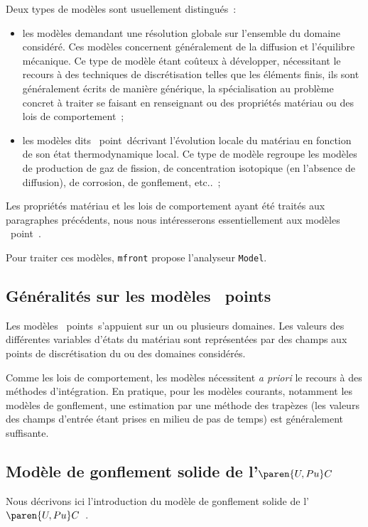 \documentclass[rectoverso,pleiades,pstricks,leqno,anti]{texmf/note_technique_2010}
\newcommand{\mfront}{\texttt{mfront}}
\newcommand{\upuc}{$\paren{U,Pu}C$}
\begin{document}
Deux types de modèles sont usuellement distingués~:
\begin{itemize}
\item les modèles demandant une résolution globale sur l'ensemble du
  domaine considéré. Ces modèles concernent généralement de la
  diffusion et l'équilibre mécanique. Ce type de modèle étant coûteux
  à développer, nécessitant le recours à des techniques de
  discrétisation telles que les éléments finis, ils sont généralement
  écrits de manière générique, la spécialisation au problème concret à
  traiter se faisant en renseignant ou des propriétés matériau ou des
  lois de comportement~;
\item les modèles dits \og~point~\fg décrivant l'évolution locale du
  matériau en fonction de son état thermodynamique local. Ce type de modèle
  regroupe les modèles de production de gaz de fission, de concentration
  isotopique (en l'absence de diffusion), de corrosion, de gonflement, etc..~;
\end{itemize}

Les propriétés matériau et les lois de comportement ayant été traités aux
paragraphes précédents, nous nous intéresserons essentiellement aux 
modèles \og~point~\fg.

Pour traiter ces modèles, \mfront{} propose l'analyseur \texttt{Model}.

\subsection{Généralités sur les modèles \og~points~\fg}

Les modèles \og~points~\fg s'appuient sur un ou plusieurs domaines.
Les valeurs des différentes variables d'états du matériau sont
représentées par des champs aux points de discrétisation du ou
des domaines considérés.

Comme les lois de comportement, les modèles nécessitent
\textit{a priori} le recours à des méthodes d'intégration.
En pratique, pour les modèles courants, notamment les modèles
de gonflement, une estimation par une méthode des
trapèzes (les valeurs des champs d'entrée étant prises en
milieu de pas de temps) est généralement suffisante.

\subsection{Modèle de gonflement solide de l'\upuc{}}

Nous décrivons ici l'introduction du modèle de gonflement
solide de l'\upuc{}~\cite{pelletier04:_recueil}.
\end{document}
